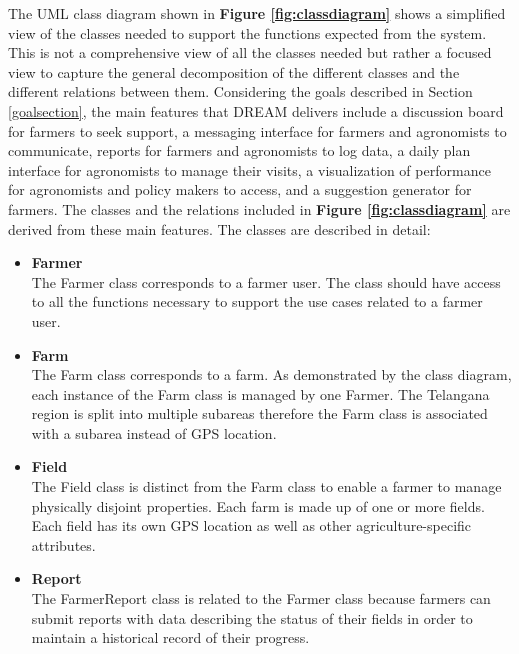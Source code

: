 \begin{flushleft}
The UML class diagram shown in \textbf{Figure \ref{fig:classdiagram}} shows a simplified view of the classes needed to support the functions expected from the system. This is not a comprehensive view of all the classes needed but rather a focused view to capture the general decomposition of the different classes and the different relations between them. Considering the goals described in Section \ref{goalsection}, the main features that DREAM delivers include a discussion board for farmers to seek support, a messaging interface for farmers and agronomists to communicate, reports for farmers and agronomists to log data, a daily plan interface for agronomists to manage their visits, a visualization of performance for agronomists and policy makers to access, and a suggestion generator for farmers. The classes and the relations included in \textbf{Figure \ref{fig:classdiagram}} are derived from these main features. The classes are described in detail:

\begin{itemize}

\item \textbf{Farmer}\\
The Farmer class corresponds to a farmer user. The class should have access to all the functions necessary to support the use cases related to a farmer user. 

\item \textbf{Farm}\\
The Farm class corresponds to a farm. As demonstrated by the class diagram, each instance of the Farm class is managed by one Farmer. The Telangana region is split into multiple subareas therefore the Farm class is associated with a subarea instead of GPS location.

\item \textbf{Field}\\
The Field class is distinct from the Farm class to enable a farmer to manage physically disjoint properties. Each farm is made up of one or more fields. Each field has its own GPS location as well as other agriculture-specific attributes.

\item \textbf{Report}\\
The FarmerReport class is related to the Farmer class because farmers can submit reports with data describing the status of their fields in order to maintain a historical record of their progress. 


\end{itemize}
\end{flushleft}
